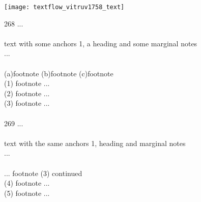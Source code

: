\documentclass[fontsize=11pt, paper=a4, 
DIV15,
normalheadings,
parskip=half-, 
pointlessnumbers]{scrartcl}
\begin{document}
\newpage
\begin{example}

\texttt{[image: textflow\_vitruv1758\_text]}

\begin{typeLatin}
 268 ...  \\
 \\
text with some anchors 1\bold{>}, a heading and some marginal notes \\
... \\
 \\ 
 (a)\bold{>}footnote  (b)\bold{>}footnote  (c)\bold{>}footnote \\
 (1)\bold{>} footnote ...  \\
 (2)\bold{>} footnote ...  \\
 (3)\bold{>} footnote ...  \\
\\
 269 ...  \\
 \\
text with the same anchors 1\bold{>}, heading and marginal notes \\
... \\
 \\ 
 ... footnote (3) continued \\
 (4)\bold{>} footnote ...  \\
 (5)\bold{>} footnote ...  \\
\end{typeLatin}
\end{example}

\end{document}
